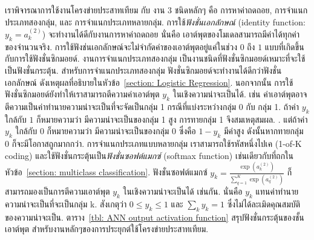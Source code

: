 เราพิจารณาการใช้งานโครงข่ายประสาทเทียม กับ งาน $3$ ชนิดหลักๆ คือ การหาค่าถดถอย, การจำแนกประเภทสองกลุ่ม, และ การจำแนกประเภทหลายกลุ่ม.
การใช้\textit{ฟังชั่นเอกลักษณ์} (identity function: $y_k = a^{(2)}_k$) จะทำงานได้ดีกับงานการหาค่าถดถอย
นั่นคือ เอาต์พุตของโมเดลสามารถมีค่าได้ทุกค่าของจำนวนจริง.
การใช้ฟังช่นเอกลักษณ์จะไม่จำกัดค่าของเอาต์พุตอยู่แค่ในช่วง $0$ ถึง $1$ แบบที่เกิดขึ้นกับการใช้ฟังชั่นซิกมอยด์.
%
งานการจำแนกประเภทสองกลุ่ม เป็นงานชนิดที่ฟังชั่นซิกมอยด์เหมาะที่จะใช้เป็นฟังชั่นกระตุ้น.
สำหรับการจำแนกประเภทสองกลุ่ม ฟังชั่นซิกมอยด์จะทำงานได้ดีกว่าฟังชั่นเอกลักษณ์ ดังเหตุผลที่อธิบายในหัวข้อ~\ref{section: Logistic Regression}.
นอกจากนั้น การใช้ฟังชั่นซิกมอยด์ยังทำให้เราสามารถตีความค่าเอาต์พุต $y_k$ ในเชิงความน่าจะเป็นได้.
เช่น ค่าเอาต์พุตอาจตีความเป็นค่าทำนายความน่าจะเป็นที่จะจัดเป็นกลุ่ม 1 กรณีที่แบ่งระหว่างกลุ่ม 0 กับ กลุ่ม 1.
ถ้าค่า $y_k$ ใกล้กับ $1$ ก็หมายความว่า มีความน่าจะเป็นของกลุ่ม 1 สูง
การทายกลุ่ม 1 จึงสมเหตุสมผล.
.
แต่ถ้าค่า $y_k$ ใกล้กับ $0$ ก็หมายความว่า มีความน่าจะเป็นของกลุ่ม 0 ซึ่งคือ $1 - y_k$ มีค่าสูง
ดังนั้นหากทายกลุ่ม 0 ก็จะมีโอกาสถูกมากกว่า.
%
การจำแนกประเภทแบบหลายกลุ่ม เราสามารถใช้รหัสหนึ่งไปเค (1-of-K coding) และใช้ฟังชั่นกระตุ้นเป็น\textit{ฟังชั่นซอฟต์แมกซ์} (softmax function)   เช่นเดียวกับที่ถกในหัวข้อ~\ref{section: multiclass classification}.
ฟังชั่นซอฟต์แมกซ์ $y_k = \frac{\exp(a^{(2)}_k)}{\sum_{q=1}^K \exp(a^{(2)}_q)}$ ก็สามารถมองเป็นการตีความเอาต์พุต $y_k$ ในเชิงความน่าจะเป็นได้ เช่นกัน.
นั่นคือ $y_k$ แทนค่าทำนายความน่าจะเป็นที่จะเป็นกลุ่ม k.
สังเกตุว่า $0 \leq y_k \leq 1$ และ $\sum_k y_k = 1$ ซึ่งไม่ได้ละเมิดคุณสมบัติของความน่าจะเป็น.
ตาราง~\ref{tbl: ANN output activation function} สรุปฟังชั่นกระตุ้นของชั้นเอาต์พุต สำหรับงานหลักๆของการประยุกต์ใช้โครงข่ายประสาทเทียม.

